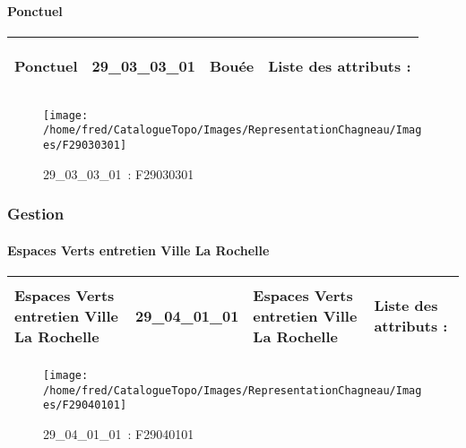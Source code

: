 \documentclass[12pt,titlepage,oneside]{book}
\begin{document}
\paragraph{Ponctuel}
\noindent
\vspace{\baselineskip}

\renewcommand{\arraystretch}{1.2}
\begin{supertabular}{|p{10cm}|c|p{13cm}|p{12cm}|}
 Ponctuel & 29\_03\_03\_01 & Bouée & Liste des attributs :
\begin{enumerate}
\end{enumerate}
\\
\hline
\end{supertabular}
\begin{figure}[h!]
  \hfill         %
  \begin{minipage}[t]{3cm}
    \begin{center}
      \texttt{[image: /home/fred/CatalogueTopo/Images/RepresentationChagneau/Images/F29030301]}
      \caption[~29\_03\_03\_01]{\small{29\_03\_03\_01~:} \tiny{F29030301}}\label{F29030301}
    \end{center}
  \end{minipage}
\end{figure}

\subsubsection{\large Gestion}
\paragraph{Espaces Verts entretien Ville La Rochelle}
\noindent
\vspace{\baselineskip}

\renewcommand{\arraystretch}{1.2}
\begin{supertabular}{|p{10cm}|c|p{13cm}|p{12cm}|}
 Espaces Verts entretien Ville La Rochelle & 29\_04\_01\_01 & Espaces Verts entretien Ville La Rochelle & Liste des attributs :
\begin{enumerate}
\end{enumerate}
\\
\hline
\end{supertabular}
\begin{figure}[h!]
  \hfill         %
  \begin{minipage}[t]{3cm}
    \begin{center}
      \texttt{[image: /home/fred/CatalogueTopo/Images/RepresentationChagneau/Images/F29040101]}
      \caption[~29\_04\_01\_01]{\small{29\_04\_01\_01~:} \tiny{F29040101}}\label{F29040101}
    \end{center}
  \end{minipage}
\end{figure}
\end{document}
